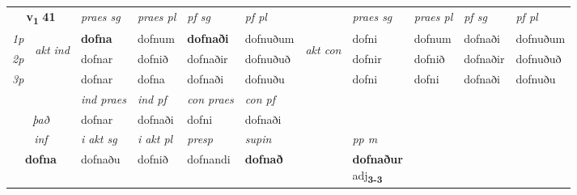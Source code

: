 \noindent
\begin{tabular}{lllllllllll} \toprule
\multicolumn{2}{c}{\textbf{v{\textsubscript{1}}} \Large{\textbf{41}}}  &  \textit{praes sg}  & \textit{praes pl}  &\textit{ pf sg} & \textit{pf pl} &  &  \textit{praes sg}  & \textit{praes pl}  & \textit{pf sg} & \textit{pf pl } \\*
	\cmidrule{3-6} \cmidrule{8-11}
 {\textit{1p}} & \multirow{3}{*}{\begin{turn}{90}\textit{akt ind}\end{turn}} & \textbf{dofna} & dofnum & \textbf{dofnaði} & dofnuðum & \multirow{3}{*}{\begin{turn}{90}\textit{akt con}\end{turn}} &dofni & dofnum & dofnaði & dofnuðum\\*
 {\textit{2p}} &  &  dofnar  & dofnið & dofnaðir & dofnuðuð & & dofnir & dofnið & dofnaðir & dofnuðuð \\*
{\textit{3p}} &  & dofnar & dofna & dofnaði & dofnuðu & & dofni & dofni& dofnaði & dofnuðu \\*
\cmidrule{3-6} \cmidrule{8-11}

   & &  \textit{ind praes} & \textit{ind pf} & \textit{con praes} & \textit{con pf} \\*
\multicolumn{2}{c}{ \textit{það} } & dofnar & dofnaði & dofni & dofnaði \\*

\cmidrule{3-8}
   \multicolumn{2}{c}{\textit{inf}}  & \textit{i akt sg} & \textit{i akt pl}   & \textit{presp} & \textit{supin}  && \textit{pp m} \\*
  \multicolumn{2}{c}{\textbf{dofna}} & dofnaðu  & dofnið   & dofnandi &  \textbf{dofnað}  && \specialcell{\textbf{dofnaður} \\ adj\textbf{\textsubscript{3-3}}} \\*
\end{tabular}

